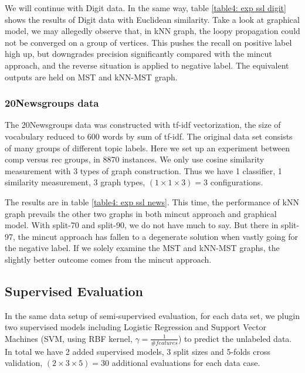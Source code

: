 We will continue with Digit data. In the same way, table \ref{table4: exp ssl digit} shows the results of Digit data with Euclidean similarity.  Take a look at graphical model, we may allegedly observe that, in kNN graph, the loopy propagation could not be converged on a group of vertices. This pushes the recall on positive label high up, but downgrades precision significantly compared with the mincut approach, and the reverse situation is applied to negative label. The equivalent outputs are held on MST and kNN-MST graph.

\subsubsection*{20Newsgroups data}
The 20Newsgroups data was constructed with tf-idf vectorization, the size of vocabulary reduced to 600 words by sum of tf-idf. The original data set consists of many groups of different topic labels. Here we set up an experiment between comp versus rec groups, in 8870 instances. We only use cosine similarity measurement with 3 types of graph construction. Thus we have 1 classifier, 1 similarity measurement, 3 graph types, $(1 \times 1 \times 3) = 3$ configurations.

The results are in table \ref{table4: exp ssl news}. This time, the performance of kNN graph prevails the other two graphs in both mincut approach and graphical model. With split-70 and split-90, we do not have much to say. But there in split-97, the mincut approach has fallen to a degenerate solution when vastly going for the negative label. If we solely examine the MST and kNN-MST graphs, the slightly better outcome comes from the mincut approach.  

\subsection{Supervised Evaluation}
\label{subsection: exp sl}

In the same data setup of semi-supervised evaluation, for each data set, we plugin two supervised models including Logistic Regression and Support Vector Machines (SVM, using RBF kernel, $\gamma=\frac{1}{\#features}$) to predict the unlabeled data. In total we have 2 added supervised models, 3 split sizes and 5-folds cross validation, $(2 \times 3 \times 5) = 30$ additional evaluations for each data case. 

